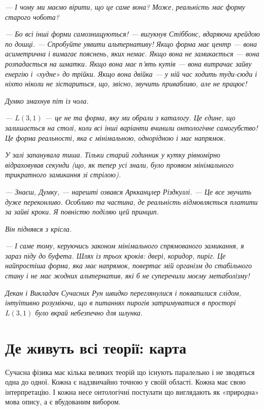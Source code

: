 \documentclass[12pt, a4paper, openany]{book}
\begin{document}
\begin{terrybox}
\textit{--- І чому ми маємо вірити, що це саме вона? Може, реальність має форму старого чобота?}

\textit{--- Бо всі інші форми самознищуються! --- вигукнув Стіббонс, вдаряючи крейдою по дошці. --- Спробуйте уявити альтернативу! Якщо форма має центр --- вона асиметрична і вимагає пояснень, яких немає. Якщо вона не замикається --- вона розпадається на шматки. Якщо вона має п'ять кутів --- вона витрачає зайву енергію і «худне» до трійки. Якщо вона двійка --- у ній час ходить туди-сюди і ніхто ніколи не зістариться, що, звісно, звучить привабливо, але не працює!}

\textit{Думко змахнув піт із чола.}

\textit{--- $L(3,1)$ --- це не та форма, яку ми обрали з каталогу. Це єдине, що залишається на столі, коли всі інші варіанти вчинили онтологічне самогубство! Це форма реальності, яка є мінімальною, однорідною і має напрямок.}

\textit{У залі запанувала тиша. Тільки старий годинник у кутку рівномірно відраховував секунди (що, як тепер усі знали, було проявом мінімального трикратного замикання зі стрілою).}

\textit{--- Знаєш, Думку, --- нарешті озвався Аркканцлер Різдкуллі. --- Це все звучить дуже переконливо. Особливо та частина, де реальність відмовляється платити за зайві кроки. Я повністю поділяю цей принцип.}

\textit{Він піднявся з крісла.}

\textit{--- І саме тому, керуючись законом мінімального спрямованого замикання, я зараз піду до буфета. Шлях із трьох кроків: двері, коридор, пиріг. Це найпростіша форма, яка має напрямок, повертає мій організм до стабільного стану і не має жодних альтернатив, які б не суперечили моєму метаболізму!}

\textit{Декан і Викладач Сучасних Рун швидко переглянулися і поквапилися слідом, інтуїтивно розуміючи, що в питаннях пирогів затримуватися в просторі $L(3,1)$ було вкрай небезпечно для шлунка.}
\end{terrybox}


\chapter{Де живуть всі теорії: карта}

Сучасна фізика має кілька великих теорій що існують паралельно і не зводяться одна до одної. Кожна є надзвичайно точною у своїй області. Кожна має свою інтерпретацію. І кожна несе онтологічні постулати що виглядають як «природна» мова опису, а є вбудованим вибором.
\end{document}

